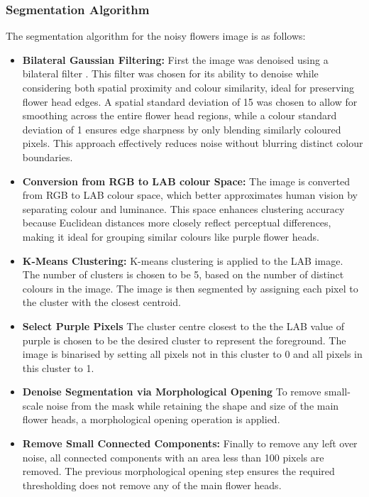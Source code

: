 \documentclass[11pt]{article}
\begin{document}
\subsubsection{Segmentation Algorithm}
The segmentation algorithm for the noisy flowers image is as follows:
\begin{itemize}
    \item \textbf{Bilateral Gaussian Filtering:} First the image was denoised using a bilateral filter \cite{710815}. This filter was chosen for its ability to denoise while considering both spatial proximity and colour similarity, ideal for preserving flower head edges. A spatial standard deviation of 15 was chosen to allow for smoothing across the entire flower head regions, while a colour standard deviation of 1 ensures edge sharpness by only blending similarly coloured pixels. This approach effectively reduces noise without blurring distinct colour boundaries.
    \item \textbf{Conversion from RGB to LAB colour Space:} The image is converted from RGB to LAB colour space, which better approximates human vision by separating colour and luminance. This space enhances clustering accuracy because Euclidean distances more closely reflect perceptual differences, making it ideal for grouping similar colours like purple flower heads.
    \item \textbf{K-Means Clustering:} K-means clustering is applied to the LAB image. The number of clusters is chosen to be 5, based on the number of distinct colours in the image. The image is then segmented by assigning each pixel to the cluster with the closest centroid.
    \item \textbf{Select Purple Pixels} The cluster centre closest to the the LAB value of purple is chosen to be the desired cluster to represent the foreground. The image is binarised by setting all pixels not in this cluster to 0 and all pixels in this cluster to 1.
    \item \textbf{Denoise Segmentation via Morphological Opening} To remove small-scale noise from the mask while retaining the shape and size of the main flower heads, a morphological opening operation is applied. 
    \item \textbf{Remove Small Connected Components:} Finally to remove any left over noise, all connected components with an area less than 100 pixels are removed. The previous morphological opening step ensures the required thresholding does not remove any of the main flower heads.
\end{itemize}
\end{document}
